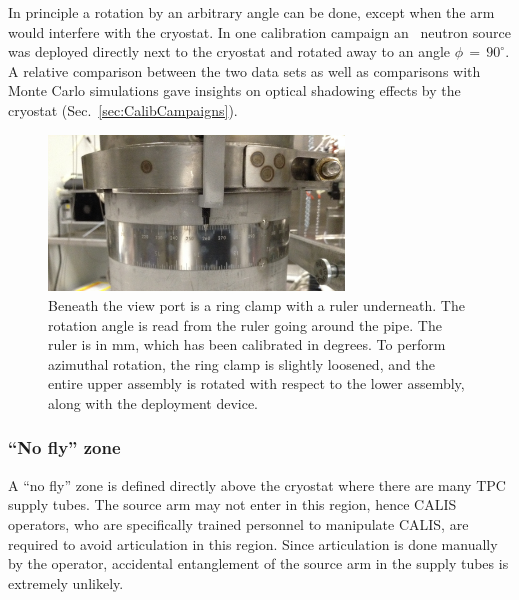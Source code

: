 In principle a rotation by an arbitrary angle can be done, except when the arm would interfere with the cryostat. In one calibration campaign an \AmBe\ neutron source was deployed directly next to the cryostat and rotated away to an angle $\phi\,=\,90^\circ$.  A relative comparison between the two data sets as well as comparisons with Monte Carlo simulations gave insights on optical shadowing effects by the cryostat (Sec.~\ref{sec:CalibCampaigns}). 



\begin{figure}[htbp]
 \centering
  \includegraphics[width=0.7\textwidth]{Figures/RingClamp_WithPin_IMG_2669.JPG}
  \caption{Beneath the view port is a ring clamp with a ruler underneath. The rotation angle is read from the ruler going around the pipe. The ruler is in mm, which has been calibrated in degrees. To perform azimuthal rotation, the ring clamp is slightly loosened, and the entire upper assembly is rotated with respect to the lower assembly, along with the deployment device.}
  \label{fig:ring_clamp}
\end{figure} 

\subsubsection*{``No fly'' zone}
A ``no fly'' zone is defined directly above the cryostat where there are many TPC supply tubes. The source arm may not enter in this region, hence CALIS operators, who are specifically trained personnel to manipulate CALIS, are required to avoid articulation in this region. Since articulation is done manually by the operator, accidental entanglement of the source arm in the supply tubes is extremely unlikely.

